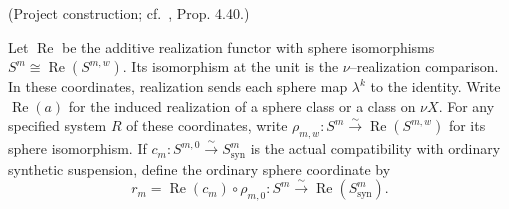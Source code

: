 \begin{definition}
\label{sem:Literature:realization-coordinates}
(Project construction; cf.\ \cite{Pst}, Prop. 4.40.)\par{}

Let $\operatorname{Re}$ be the additive realization functor with sphere isomorphisms $S^m\cong\operatorname{Re}(S^{m,w})$. Its isomorphism at the unit is the $\nu$--realization comparison. In these coordinates, realization sends each sphere map $\lambda^k$ to the identity. Write $\operatorname{Re}(a)$ for the induced realization of a sphere class or a class on $\nu X$.
For any specified system $R$ of these coordinates, write
$\rho_{m,w}:S^m\xrightarrow{\sim}\operatorname{Re}(S^{m,w})$ for its
sphere isomorphism. If $c_m:S^{m,0}\xrightarrow{\sim}S^m_{\mathrm{syn}}$
is the actual compatibility with ordinary synthetic suspension, define
the ordinary sphere coordinate by
\[
r_m=\operatorname{Re}(c_m)\circ\rho_{m,0}:
S^m\xrightarrow{\sim}\operatorname{Re}(S^m_{\mathrm{syn}}).
\]
\end{definition}

